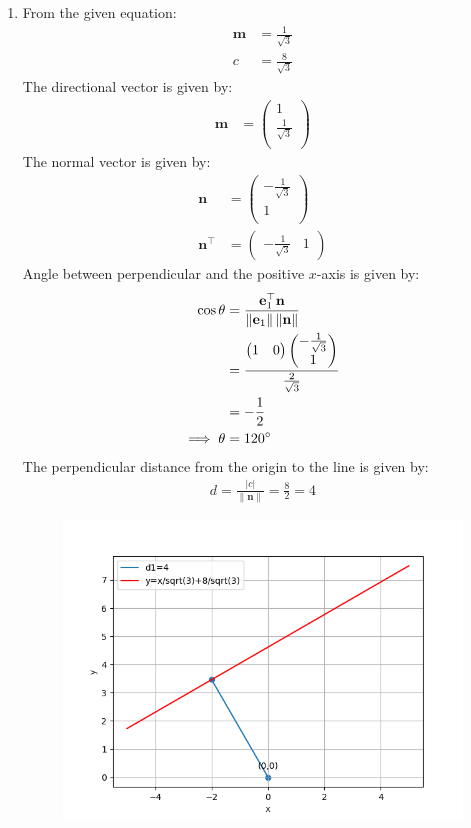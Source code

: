 \documentclass[12pt]{article}
\providecommand{\norm}[1]{\left\lVert#1\right\rVert}
\newcommand{\myvec}[1]{\ensuremath{\begin{pmatrix}#1\end{pmatrix}}}
\let\vec\mathbf
\begin{document}
\begin{enumerate}
\item From the given equation:
	\begin{align}
		\vec{m}&=\frac{1}{\sqrt{3}}\\
		c&=\frac{8}{\sqrt{3}}
	\end{align}
        The directional vector is given by:
	\begin{align}
		\vec{m}&=\myvec{1\\\frac{1}{\sqrt{3}}\\}
	\end{align}
	The normal vector is given by:
		\begin{align}
	\vec{n}&=\myvec{-\frac{1}{\sqrt{3}}\\1\\}\\
	\vec{n}^\top&=\myvec{-\frac{1}{\sqrt{3}} & 1}
			\end{align}
	Angle between perpendicular and the positive $x$-axis is given by:
		\begin{align}
		\cos\theta&=\frac{\vec{e}_{1}^\top\vec{n}}{\norm{\vec{e}_{1}}\norm{\vec{n}}}\\
			&=\frac{\myvec{1&0}\myvec{-\frac{1}{\sqrt{3}} \\ 1\\}}{\frac{2}{\sqrt{3}}}\\
			&=-\frac{1}{2}\\
			\implies	\theta&=120\degree
		\end{align}
	The perpendicular distance from the origin to the line is given by:
		\begin{align}
			d=\frac{|c|}{\norm{\vec{n}}}=\frac{8}{2}=4
		\end{align}
\begin{figure}[H]
	\begin{center} 
	    \includegraphics[width=\columnwidth]{figs/line1.png}

\end{center}
\end{figure}
\end{enumerate}
\end{document}

